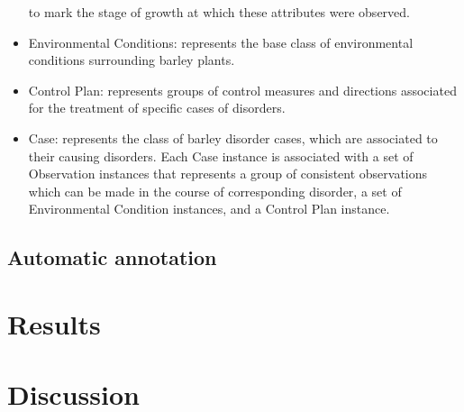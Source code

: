 \documentclass{frontiersSCNS} %
\begin{document}
\begin{itemize}
to mark the stage of growth at which these attributes were observed.
\item Environmental Conditions: represents the base class of environmental conditions
surrounding barley plants.
\item Control Plan: represents groups of control measures and directions associated for the
treatment of specific cases of disorders.
\item Case: represents the class of barley disorder cases, which are associated to their causing
disorders. Each Case instance is associated with a set of Observation instances that
represents a group of consistent observations which can be made in the course of
corresponding disorder, a set of Environmental Condition instances, and a Control Plan
instance.
\end{itemize}

\subsection{Automatic annotation}

\section{Results}








\section{Discussion}
\end{document}
